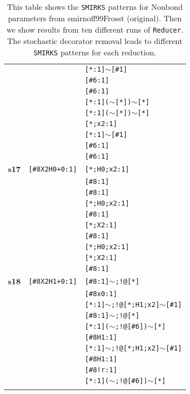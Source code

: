 \begin{longtable}{>{\baselineskip=10pt}p{} >{\baselineskip=10pt}p{} >{\baselineskip=10pt}p{}}
 &  & \texttt{[*:1]$\sim$[\#1]} \\ 
 &  & \texttt{[\#6:1]} \\ 
 &  & \texttt{[\#6:1]} \\ 
 &  & \texttt{[*:1]($\sim$[*])$\sim$[*]} \\ 
 &  & \texttt{[*:1]($\sim$[*])$\sim$[*]} \\ 
 &  & \texttt{[*;x2:1]} \\ 
 &  & \texttt{[*:1]$\sim$[\#1]} \\ 
 &  & \texttt{[\#6:1]} \\ 
 &  & \texttt{[\#6:1]} \\ 
\hline 
\textbf{s17} & \texttt{[\#8X2H0+0:1]} & \texttt{[*;H0;x2:1]} \\ 
 &  & \texttt{[\#8:1]} \\ 
 &  & \texttt{[\#8:1]} \\ 
 &  & \texttt{[*;H0;x2:1]} \\ 
 &  & \texttt{[\#8:1]} \\ 
 &  & \texttt{[*;X2:1]} \\ 
 &  & \texttt{[\#8:1]} \\ 
 &  & \texttt{[*;H0;x2:1]} \\ 
 &  & \texttt{[*;X2:1]} \\ 
 &  & \texttt{[\#8:1]} \\ 
\hline 
\textbf{s18} & \texttt{[\#8X2H1+0:1]} & \texttt{[\#8:1]$\sim$;!@[*]} \\ 
 &  & \texttt{[\#8x0:1]} \\ 
 &  & \texttt{[*:1]$\sim$;!@[*;H1;x2]$\sim$[\#1]} \\ 
 &  & \texttt{[\#8:1]$\sim$;!@[*]} \\ 
 &  & \texttt{[*:1]($\sim$;!@[\#6])$\sim$[*]} \\ 
 &  & \texttt{[\#8H1:1]} \\ 
 &  & \texttt{[*:1]$\sim$;!@[*;H1;x2]$\sim$[\#1]} \\ 
 &  & \texttt{[\#8H1:1]} \\ 
 &  & \texttt{[\#8!r:1]} \\ 
 &  & \texttt{[*:1]($\sim$;!@[\#6])$\sim$[*]} \\ 
\hline 
\caption{This table shows the \texttt{SMIRKS} patterns for Nonbond parameters from smirnoff99Frosst (original). Then we show results from ten different runs of \texttt{Reducer}. The stochastic decorator removal leads to different \texttt{SMIRKS} patterns for each reduction.}
\label{tab:nonbond_alkethoh}
\end{longtable}


